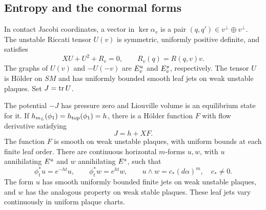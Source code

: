 \subsection{Entropy and the conormal forms}

In contact Jacobi coordinates, a vector in $\ker\alpha_v$ is a pair
$(q,q')\in v^\perp\oplus v^\perp$. The unstable Riccati tensor $U(v)$
is symmetric, uniformly positive definite, and satisfies
\begin{equation}\label{pre:riccati}
 XU+U^2+R_v=0,
 \qquad R_v(q)=R(q,v)v.
\end{equation}
The graphs of $U(v)$ and $-U(-v)$ are $E^u_v$ and $E^s_v$,
respectively. The tensor $U$ is Hölder on $SM$ and has uniformly
bounded smooth leaf jets on weak unstable plaques. Set $J=\operatorname{tr} U$.

\begin{proposition}\label{pre:entropy-forms}
The potential $-J$ has pressure zero and Liouville volume is an
equilibrium state for it. If
$h_{m_L}(\phi_1)=h_{\mathrm{top}}(\phi_1)=h$, there is a Hölder function $F$
with flow derivative satisfying
\begin{equation}\label{pre:cohomology}
 J=h+XF.
\end{equation}
The function $F$ is smooth on weak unstable plaques, with uniform
bounds at each finite leaf order. There are continuous horizontal
$m$-forms $u,w$, with $u$ annihilating $E^u$ and $w$ annihilating
$E^s$, such that
\begin{equation}\label{pre:volume-transport}
 \phi_t^*u=e^{-ht}u,
 \qquad \phi_t^*w=e^{ht}w,
 \qquad u\wedge w=c_*(d\alpha)^m,
 \quad c_*\ne0.
\end{equation}
The form $u$ has smooth uniformly bounded finite jets on weak
unstable plaques, and $w$ has the analogous property on weak stable
plaques. These leaf jets vary continuously in uniform plaque charts.
\end{proposition}

